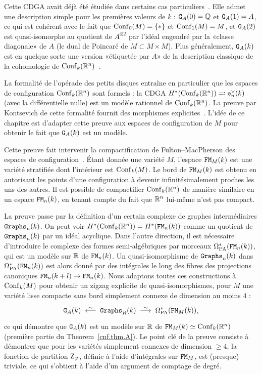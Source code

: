Cette CDGA avait déjà été étudiée dans certains cas particuliers~\cite{CohenTaylor1978,BenderskyGitler1991,Kriz1994,Totaro1996,FelixThomas2004}.
Elle admet une description simple pour les premières valeurs de $k$ : $\mathtt{G}_{A}(0) = \mathbb{Q}$ et $\mathtt{G}_{A}(1) = A$, ce qui est cohérent avec le fait que $\operatorname{Conf}_{0}(M) = \{*\}$ et $\operatorname{Conf}_{1}(M) = M$, et $\mathtt{G}_{A}(2)$ est quasi-isomorphe au quotient de $A^{\otimes 2}$ par l'idéal engendré par la «classe diagonale» de $A$ (le dual de Poincaré de $M \subset M \times M$).
Plus généralement, $\mathtt{G}_{A}(k)$ est en quelque sorte une version «étiquetée par $A$» de la description classique de la cohomologie de $\operatorname{Conf}_{k}(\mathbb{R}^{n})$~\cite{Arnold1969,Cohen1976}.

La formalité de l'opérade des petits disques entraîne en particulier que les espaces de configuration $\operatorname{Conf}_{k}(\mathbb{R}^{n})$ sont formels : la CDGA $H^{*}(\operatorname{Conf}_{k}(\mathbb{R}^{n})) \eqqcolon \mathtt{e}_{n}^{\vee}(k)$ (avec la différentielle nulle) est un modèle rationnel de $\operatorname{Conf}_{k}(\mathbb{R}^{n})$.
La preuve par Kontsevich de cette formalité fournit des morphismes explicites~\cite{Kontsevich1999,LambrechtsVolic2014}.
L'idée de ce chapitre est d'adapter cette preuve aux espaces de configuration de $M$ pour obtenir le fait que $\mathtt{G}_{A}(k)$ est un modèle.

Cette preuve fait intervenir la compactification de Fulton--MacPherson des espaces de configuration~\cite{FultonMacPherson1994,AxelrodSinger1994}.
Étant donnée une variété $M$, l'espace $\mathtt{FM}_{M}(k)$ est une variété stratifiée dont l'intérieur est $\operatorname{Conf}_{k}(M)$.
Le bord de $\mathtt{FM}_{M}(k)$ est obtenu en autorisant les points d'une configuration à devenir infinitésimalement proches les uns des autres.
Il est possible de compactifier $\operatorname{Conf}_{k}(\mathbb{R}^{n})$ de manière similaire en un espace $\mathtt{FM}_{n}(k)$, en tenant compte du fait que $\mathbb{R}^{n}$ lui-même n'est pas compact.

La preuve passe par la définition d'un certain complexe de graphes intermédiaires $\mathtt{Graphs}_{n}(k)$.
On peut voir $H^{*}(\operatorname{Conf}_{k}(\mathbb{R}^{n})) = H^{*}(\mathtt{FM}_{n}(k))$ comme un quotient de $\mathtt{Graphs}_{n}(k)$ par un idéal acyclique.
Dans l'autre direction, il est nécessaire d'introduire le complexe des formes semi-algébriques par morceaux $\Omega_{\mathrm{PA}}^{*}(\mathtt{FM}_{n}(k))$, qui est un modèle sur $\mathbb{R}$ de $\mathtt{FM}_{n}(k)$.
Un quasi-isomorphisme de $\mathtt{Graphs}_{n}(k)$ dans $\Omega_{\mathrm{PA}}^{*}(\mathtt{FM}_{n}(k))$ est alors donné par des intégrales le long des fibres des projections canoniques $\mathtt{FM}_{n}(k+l) \rightarrow \mathtt{FM}_{n}(k)$.
Nous adaptons toutes ces constructions à $\operatorname{Conf}_{k}(M)$ pour obtenir un zigzag explicite de quasi-isomorphismes, pour $M$ une variété lisse compacte sans bord simplement connexe de dimension au moins $4$ :
\[ \GG{A}(k) \qiso* \Graphs_{R}(k) \qiso \OmPA^{*}(\FM_{M}(k)), \]
ce qui démontre que $\mathtt{G}_{A}(k)$ est un modèle sur $\mathbb{R}$ de $\mathtt{FM}_{M}(k) \simeq \operatorname{Conf}_{k}(\mathbb{R}^{n})$ (première partie du Theorem~\ref{cnf.thm.A}).
Le point clé de la preuve consiste à démontrer que pour les variétés simplement connexes de dimension $\geq 4$, la fonction de partition $\mathrm{Z}_{\varphi}$, définie à l'aide d'intégrales sur $\mathtt{FM}_{M}$, est (presque) triviale, ce qui s'obtient à l'aide d'un argument de comptage de degré.

